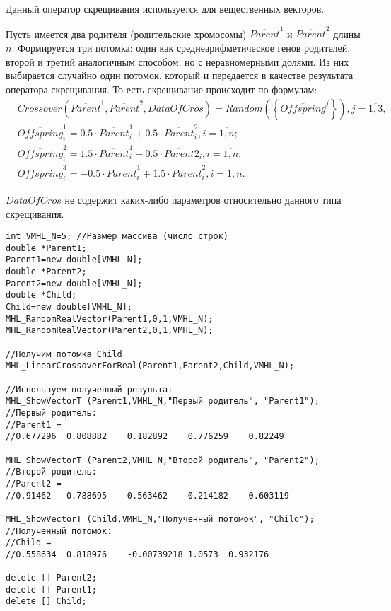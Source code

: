 \documentclass[a4paper,12pt]{article}
\begin{document}
Данный оператор скрещивания используется для вещественных векторов.

Пусть имеется два родителя (родительские хромосомы) $ \overline{Parent}^1 $ и $ \overline{Parent}^2$ длины $n$. Формируется три потомка: один как среднеарифметическое генов родителей, второй и третий аналогичным способом, но с неравномерными долями.  Из них выбирается случайно один потомок, который и передается в качестве результата оператора скрещивания. То есть скрещивание происходит по формулам:
\begin{align}
\label{SetOfOperatorsAlgorithms:eq:LinearCrossoverForReal}
&Crossover \left( \overline{Parent}^1, \overline{Parent}^2, DataOfCros\right)=Random \left(\left\lbrace \overline{Offspring}^j\right\rbrace  \right), j=\overline{1,3}, \\
& \overline{Offspring}^1_i=0.5\cdot\overline{Parent}^1_i+0.5\cdot\overline{Parent}^2_i , i=\overline{1,n};\nonumber\\
&\overline{Offspring}^2_i=1.5\cdot\overline{Parent}^1_i-0.5\cdot\overline{Parent}2_i , i=\overline{1,n};\nonumber\\
&\overline{Offspring}^3_i=-0.5\cdot\overline{Parent}^1_i+1.5\cdot\overline{Parent}^2_i , i=\overline{1,n}.\nonumber
\end{align}

$ DataOfCros $ не содержит каких-либо параметров относительно данного типа скрещивания.


\begin{lstlisting}[label=code_use_MHL_LinearCrossoverForReal,caption=Пример использования]
int VMHL_N=5; //Размер массива (число строк)
double *Parent1;
Parent1=new double[VMHL_N];
double *Parent2;
Parent2=new double[VMHL_N];
double *Child;
Child=new double[VMHL_N];
MHL_RandomRealVector(Parent1,0,1,VMHL_N);
MHL_RandomRealVector(Parent2,0,1,VMHL_N);

//Получим потомка Child
MHL_LinearCrossoverForReal(Parent1,Parent2,Child,VMHL_N);

//Используем полученный результат
MHL_ShowVectorT (Parent1,VMHL_N,"Первый родитель", "Parent1");
//Первый родитель:
//Parent1 =
//0.677296	0.808882	0.182892	0.776259	0.82249

MHL_ShowVectorT (Parent2,VMHL_N,"Второй родитель", "Parent2");
//Второй родитель:
//Parent2 =
//0.91462	0.788695	0.563462	0.214182	0.603119

MHL_ShowVectorT (Child,VMHL_N,"Полученный потомок", "Child");
//Полученный потомок:
//Child =
//0.558634	0.818976	-0.00739218	1.0573	0.932176

delete [] Parent2;
delete [] Parent1;
delete [] Child;
\end{lstlisting}
\end{document}
